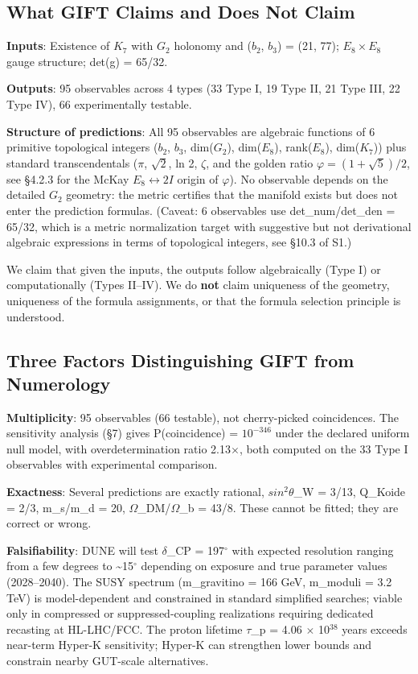 \documentclass[11pt,a4paper]{article}
\begin{document}
\subsection{What GIFT Claims and Does Not Claim}

\textbf{Inputs}: Existence of \(K_{7}\) with \(G_{2}\) holonomy and
(\(b_{2}\), \(b_{3}\)) = (21, 77); \(E_{8} \times E_{8}\) gauge
structure; det(g) = 65/32.

\textbf{Outputs}: 95 observables across 4 types (33 Type I, 19 Type II,
21 Type III, 22 Type IV), 66 experimentally testable.

\textbf{Structure of predictions}: All 95 observables are algebraic
functions of 6 primitive topological integers (\(b_{2}\), \(b_{3}\),
dim(\(G_{2}\)), dim(\(E_{8}\)), rank(\(E_{8}\)), dim(\(K_{7}\))) plus
standard transcendentals (\(\pi\), $\sqrt{2}$, ln 2, \(\zeta\), and the golden ratio \(\varphi = (1+\sqrt{5})/2\), see §4.2.3 for the McKay $E_8 \leftrightarrow 2I$ origin of \(\varphi\)). No observable depends on
the detailed \(G_{2}\) geometry: the metric certifies that the
manifold exists but does not enter the prediction formulas. (Caveat: 6
observables use det\_num/det\_den = 65/32, which is a metric
normalization target with suggestive but not derivational algebraic
expressions in terms of topological integers, see §10.3 of S1.)

We claim that given the inputs, the outputs follow algebraically (Type
I) or computationally (Types II--IV). We do \textbf{not} claim
uniqueness of the geometry, uniqueness of the formula assignments, or
that the formula selection principle is understood.

\subsection{Three Factors Distinguishing GIFT from Numerology}

\textbf{Multiplicity}: 95 observables (66 testable), not cherry-picked
coincidences. The sensitivity analysis (§7) gives P(coincidence) =
\(10^{-346}\) under the declared uniform null model, with overdetermination ratio 2.13\(\times\), both computed
on the 33 Type I observables with experimental comparison.

\textbf{Exactness}: Several predictions are exactly rational,
\(sin^{2} \theta\)\_W = 3/13, Q\_Koide = 2/3, m\_s/m\_d = 20,
\(\Omega\)\_DM/\(\Omega\)\_b = 43/8. These cannot be fitted; they are
correct or wrong.

\textbf{Falsifiability}: DUNE will test \(\delta\)\_CP =
197\({}^{\circ}\) with expected resolution ranging from a few degrees to
\textasciitilde15\({}^{\circ}\) depending on exposure and true parameter
values (2028--2040). The SUSY spectrum (m\_gravitino = 166 GeV,
m\_moduli = 3.2 TeV) is model-dependent and constrained in standard
simplified searches; viable only in compressed or suppressed-coupling
realizations requiring dedicated recasting at HL-LHC/FCC. The proton
lifetime \(\tau\)\_p = 4.06 \(\times\) 10\(^{38}\) years exceeds
near-term Hyper-K sensitivity; Hyper-K can strengthen lower bounds and
constrain nearby GUT-scale alternatives.
\end{document}
